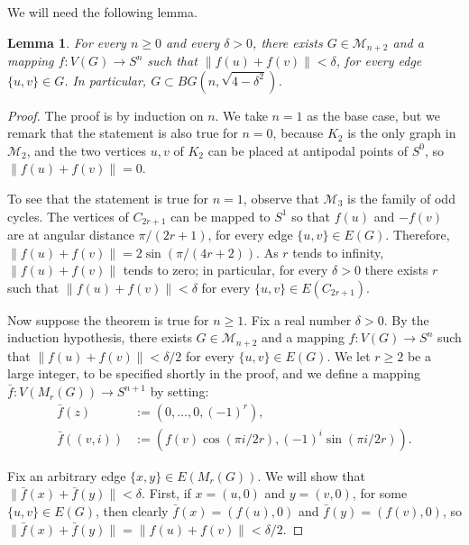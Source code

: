 \documentclass[11pt,a4paper]{amsart}
\newtheorem{lemma}[theorem]{Lemma}
\begin{document}
We will need the following lemma.

\begin{lemma}
\label{lem:BG}
  For every $n \geq 0$ and every $\delta > 0$, there exists $G \in \mathcal M_{n+2}$
  and a mapping $f:V(G) \to S^n$ such that $\|f(u)+f(v)\| < \delta$,
  for every edge $\{u,v\} \in G$. In particular, $G \subset BG(n,\sqrt{4-\delta^2})$.
\end{lemma}

\begin{proof}
  The proof is by induction on $n$. We take $n=1$ as the base case, but we
  remark that the statement is also true for $n=0$, because $K_2$ is the only
  graph in $\mathcal M_2$, and the two vertices $u,v$ of $K_2$ can be placed at
  antipodal points of $S^0$, so $\|f(u)+f(v)\|=0$.
  
  To see that the statement is true for $n=1$, observe that $\mathcal M_3$
  is the family of odd cycles. The vertices of $C_{2r+1}$ can be
  mapped to $S^1$ so that $f(u)$ and $-f(v)$  are at angular distance
  $\pi/(2r+1)$, for every edge $\{u,v\} \in E(G)$. Therefore,
  $\|f(u)+f(v)\|=2\sin(\pi/(4r+2))$. As $r$ tends to infinity,
  $\|f(u)+f(v)\|$ tends to zero; in particular, for every $\delta>0$ there exists $r$
  such that $\|f(u)+f(v)\| < \delta$ for every $\{u,v\} \in E(C_{2r+1})$.
  
  Now suppose the theorem is true for $n \geq 1$. Fix a real number $\delta>0$.
  By the induction hypothesis, there exists $G \in \mathcal M_{n+2}$ and a
  mapping $f:V(G) \to S^n$ such that $\|f(u)+f(v)\| < \delta/2$ for every $\{u,v\} \in E(G)$.
  We let $r \geq 2$ be a large integer, to be specified shortly in the proof, and we
  define a mapping $\bar f:V(M_r(G)) \to S^{n+1}$ by setting:
  \begin{align*}
    \bar f(z)& :=(0, \ldots, 0,(-1)^r), \\
    \bar f((v,i)) & :=\left(f(v) \cos(\pi i/2r), (-1)^i\sin(\pi i/2r)\right).
  \end{align*}
  
  Fix an arbitrary edge $\{x,y\} \in E(M_r(G))$. We will show that $\|\bar f(x)+\bar f(y)\|<\delta$.
  First, if $x=(u,0)$ and $y=(v,0)$, for some $\{u,v\} \in E(G)$, then clearly
  $\bar f(x)=(f(u),0)$ and $\bar f(y)=(f(v),0)$, so $\|\bar f(x)+\bar f(y)\|=\|f(u)+f(v)\|<\delta/2$.
  

\end{proof}
\end{document}
